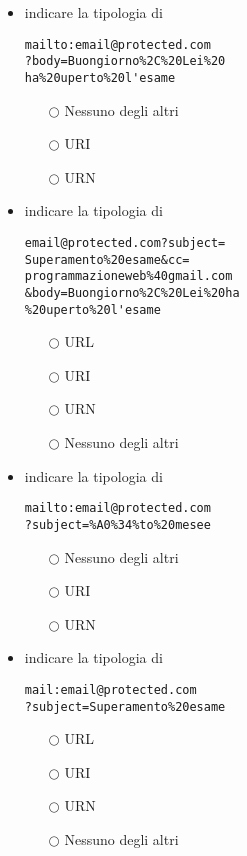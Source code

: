 \documentclass[10pt,twocolumn]{article}
\begin{document}
\begin{itemize}
    \item indicare la tipologia di
          \begin{verbatim}
mailto:email@protected.com
?body=Buongiorno%2C%20Lei%20
ha%20uperto%20l'esame 
\end{verbatim}
          \begin{itemize}
              \item[$\bigcirc$] Nessuno degli altri
              \item[$\bigcirc$] URI
              \item[$\bigcirc$] URN
          \end{itemize}
\end{itemize}
\begin{itemize}
    \item indicare la tipologia di
          \begin{verbatim}
email@protected.com?subject=
Superamento%20esame&cc=
programmazioneweb%40gmail.com
&body=Buongiorno%2C%20Lei%20ha
%20uperto%20l'esame 
\end{verbatim}
          \begin{itemize}
              \item[$\bigcirc$] URL
              \item[$\bigcirc$] URI
              \item[$\bigcirc$] URN
              \item[$\bigcirc$] Nessuno degli altri
          \end{itemize}
\end{itemize}
\begin{itemize}
    \item indicare la tipologia di
          \begin{verbatim}
mailto:email@protected.com
?subject=%A0%34%to%20mesee
\end{verbatim}
          \begin{itemize}
              \item[$\bigcirc$] Nessuno degli altri
              \item[$\bigcirc$] URI
              \item[$\bigcirc$] URN
          \end{itemize}
\end{itemize}
\begin{itemize}
    \item indicare la tipologia di
          \begin{verbatim}
mail:email@protected.com
?subject=Superamento%20esame
\end{verbatim}
          \begin{itemize}
              \item[$\bigcirc$] URL
              \item[$\bigcirc$] URI
              \item[$\bigcirc$] URN
              \item[$\bigcirc$] Nessuno degli altri
          \end{itemize}
\end{itemize}
\end{document}
